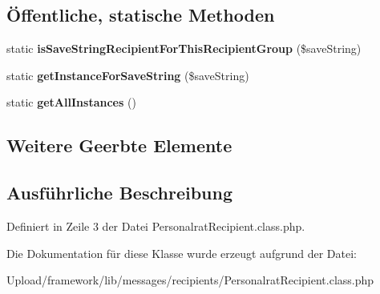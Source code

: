 \subsection*{Öffentliche, statische Methoden}
\begin{DoxyCompactItemize}
\item 
\mbox{\label{class_personalrat_recipient_af3addb850156d49fcc61947a715f6d6c}} 
static {\bfseries is\+Save\+String\+Recipient\+For\+This\+Recipient\+Group} (\$save\+String)
\item 
\mbox{\label{class_personalrat_recipient_af023c591d087eafaa51535513103da12}} 
static {\bfseries get\+Instance\+For\+Save\+String} (\$save\+String)
\item 
\mbox{\label{class_personalrat_recipient_a58c394990970909617287a8c4562ef9b}} 
static {\bfseries get\+All\+Instances} ()
\end{DoxyCompactItemize}
\subsection*{Weitere Geerbte Elemente}


\subsection{Ausführliche Beschreibung}


Definiert in Zeile 3 der Datei Personalrat\+Recipient.\+class.\+php.



Die Dokumentation für diese Klasse wurde erzeugt aufgrund der Datei\+:\begin{DoxyCompactItemize}
\item 
Upload/framework/lib/messages/recipients/Personalrat\+Recipient.\+class.\+php\end{DoxyCompactItemize}
